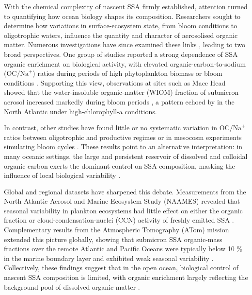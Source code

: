 \documentclass[ProofPDF]{./Styles/Jnls-Template-V3}
\begin{document}
With the chemical complexity of nascent SSA firmly established, attention turned to quantifying how ocean biology shapes its composition. Researchers sought to determine how variations in surface-ecosystem state, from bloom conditions to oligotrophic waters, influence the quantity and character of aerosolised organic matter. Numerous investigations have since examined these links \citep[see review by][]{Bertram2018}, leading to two broad perspectives. One group of studies reported a strong dependence of SSA organic enrichment on biological activity, with elevated organic-carbon-to-sodium ($\text{OC}/\text{Na}^+$) ratios during periods of high phytoplankton biomass or bloom conditions \citep[e.g.,][]{odowd2004,Facchini2008,odowd2015}. Supporting this view, observations at sites such as Mace Head showed that the water-insoluble organic-matter (WIOM) fraction of submicron aerosol increased markedly during bloom periods \citep{odowd2004}, a pattern echoed by \citet{VanPinxteren2017} in the North Atlantic under high-chlorophyll-a conditions.

In contrast, other studies have found little or no systematic variation in $\text{OC}/\text{Na}^+$ ratios between oligotrophic and productive regimes \citep[e.g.,][]{Russell2010,Quinn2014} or in mesocosm experiments simulating bloom cycles \citep{Jayarathne2016}. These results point to an alternative interpretation: in many oceanic settings, the large and persistent reservoir of dissolved and colloidal organic carbon exerts the dominant control on SSA composition, masking the influence of local biological variability \citep[e.g.,][]{Beaupre2019}.

Global and regional datasets have sharpened this debate. Measurements from the North Atlantic Aerosol and Marine Ecosystem Study (NAAMES) revealed that seasonal variability in plankton ecosystems had little effect on either the organic fraction or cloud-condensation-nuclei (CCN) activity of freshly emitted SSA \citep{Bates2020}. Complementary results from the Atmospheric Tomography (ATom) mission extended this picture globally, showing that submicron SSA organic-mass fractions over the remote Atlantic and Pacific Oceans were typically below 10 \% in the marine boundary layer and exhibited weak seasonal variability \citep{Lawler2024}. Collectively, these findings suggest that in the open ocean, biological control of nascent SSA composition is limited, with organic enrichment largely reflecting the background pool of dissolved organic matter \citep{Beaupre2019}.
\end{document}
